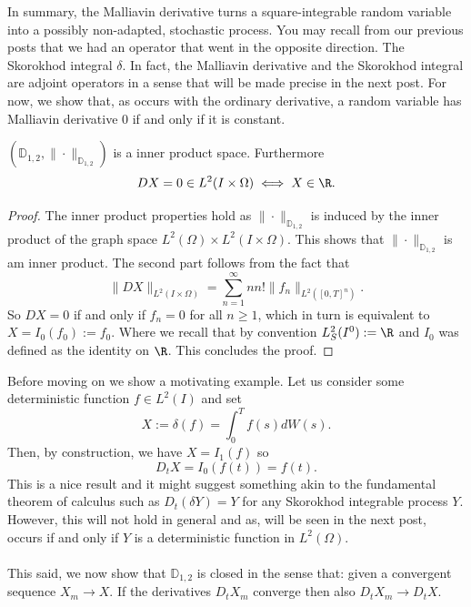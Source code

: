 \documentclass[
    a4paper,
    DIV=14,
    abstract=true,
    numbers=noenddot
]{scrartcl}
\begin{document}
In summary, the Malliavin derivative turns a square-integrable random variable into
a possibly non-adapted, stochastic process. You may recall from our previous posts that we had an operator that went in the opposite direction. The Skorokhod integral $\delta $. In fact, the Malliavin derivative and the Skorokhod integral are adjoint operators in a sense that will be made precise in the next post. For now, we show that, as occurs with the ordinary derivative, a random variable has Malliavin derivative $0$ if and only if it is constant.
\begin{corollary}\label{normedspace}
	$(\mathbb{D}_{1,2},\|\cdot \|_{\mathbb{D}_{1,2}})$ is a inner product space. Furthermore
	\begin{equation*}
		D X=0 \in L^2(I \times \Omega)\iff X\in \R.
	\end{equation*}
\end{corollary}
\begin{proof}
	The inner product properties hold as $ \|\cdot\|_{\mathbb{D}_{1,2}}$ is induced by the inner product of the graph space $L^2(\Omega) \times L^2(I \times \Omega)$. This shows that $\|\cdot \|_{\mathbb{D}_{1,2}}$ is am inner product. The second part follows from the fact that
	\begin{equation*}
		\|DX\|_{L^2(I \times \Omega)}=\sum_{n=1}^{\infty} n n!\|f_{n}\|_{L^2([0,T]^n)}.	\end{equation*}
	So $DX=0$ if and only if  $f_n=0$ for all $n\geq 1$, which in turn is equivalent to  $X=I_0(f_0):=f_0$. Where we recall that by convention $L^2_{S}(I^0):=\R$ and $I_0$ was defined as the identity on  $\R$.  This concludes the proof.
\end{proof}
Before moving on we show a motivating example. Let us consider some deterministic function $f\in L^2(I)$ and set $$X:=\delta(f)= \int_{0}^T f(s)dW(s).$$ Then, by construction, we have $X=I_1(f)$ so
\begin{equation*}
	D_t X= I_0(f(t))=f(t).
\end{equation*}
This is a nice result and it might suggest something akin to the fundamental theorem of calculus such as $D_t(\delta Y)=Y$ for any Skorokhod integrable process $Y$. However, this will not hold in general and as, will be seen in the next post, occurs if and only if $Y$ is a deterministic function in $L^2(\Omega)$.\\\\
This said, we now show that $\mathbb{D}_{1,2}$ is closed in the sense that: given a convergent sequence $X_m\to X$. If the derivatives  $D_tX_m$ converge then also $D_t X_m\to D_t X$.
\end{document}
